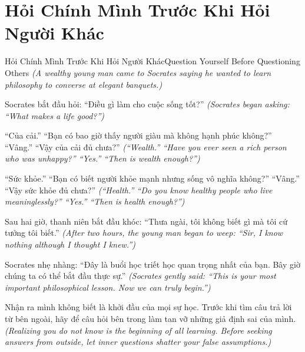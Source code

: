 \section{Hỏi Chính Mình Trước Khi Hỏi Người Khác}
\begin{truyen}{Hỏi Chính Mình Trước Khi Hỏi Người Khác}{Question Yourself Before Questioning Others}
\textit{(A wealthy young man came to Socrates saying he wanted to learn philosophy to converse at elegant banquets.)}

Socrates bắt đầu hỏi: ``Điều gì làm cho cuộc sống tốt?''
\textit{(Socrates began asking: ``What makes a life good?'')}

``Của cải.'' ``Bạn có bao giờ thấy người giàu mà không hạnh phúc không?'' ``Vâng.'' ``Vậy của cải đủ chưa?''
\textit{(``Wealth.'' ``Have you ever seen a rich person who was unhappy?'' ``Yes.'' ``Then is wealth enough?'')}

``Sức khỏe.'' ``Bạn có biết người khỏe mạnh nhưng sống vô nghĩa không?'' ``Vâng.'' ``Vậy sức khỏe đủ chưa?''
\textit{(``Health.'' ``Do you know healthy people who live meaninglessly?'' ``Yes.'' ``Then is health enough?'')}

Sau hai giờ, thanh niên bắt đầu khóc: ``Thưa ngài, tôi không biết gì mà tôi cứ tưởng tôi biết.''
\textit{(After two hours, the young man began to weep: ``Sir, I know nothing although I thought I knew.'')}

Socrates nhẹ nhàng: ``Đây là buổi học triết học quan trọng nhất của bạn. Bây giờ chúng ta có thể bắt đầu thực sự.''
\textit{(Socrates gently said: ``This is your most important philosophical lesson. Now we can truly begin.'')}

\end{truyen}

\begin{baihoc}
Nhận ra mình không biết là khởi đầu của mọi sự học. Trước khi tìm câu trả lời từ bên ngoài, hãy để câu hỏi bên trong làm tan vỡ những giả định sai của mình.
\textit{(Realizing you do not know is the beginning of all learning. Before seeking answers from outside, let inner questions shatter your false assumptions.)}
\end{baihoc}
\ngancach

